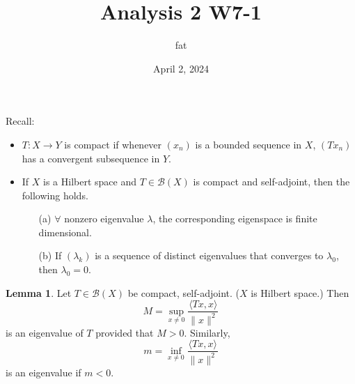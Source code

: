 \documentclass{article}
\title{Analysis 2 W7-1}
\author{fat}
\date{April 2, 2024}
\theoremstyle{definition}
\newtheorem{lem}{Lemma}
\newcommand{\B}{\mathcal B}
\begin{document}
\maketitle
\thispagestyle{fancy}
\renewcommand{\footrulewidth}{0.4pt}
\cfoot{\thepage}
\renewcommand{\headrulewidth}{0.4pt}

Recall:

\begin{itemize}
	\item $T:X \to Y$ is compact if whenever $(x_n)$ is a bounded sequence in $X$, $(T x_n)$ has a convergent subsequence in $Y$.

	\item If $X$ is a Hilbert space and $T \in \B(X)$ is compact and self-adjoint, then the following holds.
		\begin{enumerate}
			\item[(a)] $\forall $ nonzero eigenvalue $\lambda$, the corresponding eigenspace is finite dimensional. 
				
			\item[(b)] If $(\lambda_k)$ is a sequence of distinct eigenvalues that converges to $\lambda_0$, then $\lambda_0 = 0$.
		\end{enumerate}
\end{itemize}

\begin{lem}
	Let $T \in \B(X)$ be compact, self-adjoint. 
	($X$ is Hilbert space.)
	Then
	\[
		M = \sup_{x \neq 0} \frac{\langle T x, x \rangle}{\|x\|^2}
	\]
	is an eigenvalue of $T$ provided that $M > 0$.
	Similarly,
	\[
		m = \inf_{x \neq 0} \frac{\langle T x, x \rangle}{\|x\|^2}
	\]
	is an eigenvalue if $m < 0$.
\end{lem}
\end{document}
